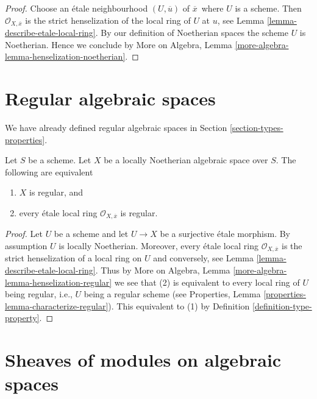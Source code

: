 \begin{proof}
Choose an \'etale neighbourhood $(U, \overline{u})$ of $\overline{x}$\
where $U$ is a scheme. Then $\mathcal{O}_{X, \overline{x}}$ is the
strict henselization of the local ring of $U$ at $u$, see
Lemma \ref{lemma-describe-etale-local-ring}.
By our definition of Noetherian spaces the scheme $U$ is Noetherian.
Hence we conclude by
More on Algebra, Lemma \ref{more-algebra-lemma-henselization-noetherian}.
\end{proof}








\section{Regular algebraic spaces}
\label{section-regular}

\noindent
We have already defined regular algebraic spaces in
Section \ref{section-types-properties}.

\begin{lemma}
\label{lemma-regular}
Let $S$ be a scheme.
Let $X$ be a locally Noetherian algebraic space over $S$.
The following are equivalent
\begin{enumerate}
\item $X$ is regular, and
\item every \'etale local ring $\mathcal{O}_{X, \overline{x}}$ is
regular.
\end{enumerate}
\end{lemma}

\begin{proof}
Let $U$ be a scheme and let $U \to X$ be a surjective \'etale morphism.
By assumption $U$ is locally Noetherian. Moreover, every \'etale local
ring $\mathcal{O}_{X, \overline{x}}$ is the strict henselization of
a local ring on $U$ and conversely, see
Lemma \ref{lemma-describe-etale-local-ring}.
Thus by
More on Algebra, Lemma \ref{more-algebra-lemma-henselization-regular}
we see that (2) is equivalent to every local ring of $U$ being
regular, i.e., $U$ being a regular scheme (see
Properties, Lemma \ref{properties-lemma-characterize-regular}).
This equivalent to (1) by
Definition \ref{definition-type-property}.
\end{proof}







\section{Sheaves of modules on algebraic spaces}
\label{section-modules}


